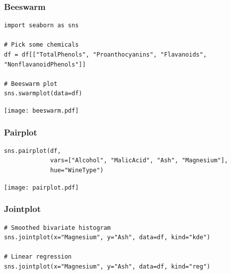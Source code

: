 \documentclass[xcolor=table]{beamer}
\begin{document}
\begin{frame}[fragile]
\frametitle{Beeswarm}

\begin{lstlisting}[style=python]
import seaborn as sns

# Pick some chemicals
df = df[["TotalPhenols", "Proanthocyanins", "Flavanoids", "NonflavanoidPhenols"]]

# Beeswarm plot
sns.swarmplot(data=df)
\end{lstlisting}

\vspace{-0.7cm}
\begin{center}
	\texttt{[image: beeswarm.pdf]}
\end{center}

\end{frame}

\begin{frame}[fragile]
\frametitle{Pairplot}

\begin{lstlisting}[style=python]
sns.pairplot(df, 
             vars=["Alcohol", "MalicAcid", "Ash", "Magnesium"],
             hue="WineType")
\end{lstlisting}

\vspace{-0.7cm}
\begin{center}
	\texttt{[image: pairplot.pdf]}
\end{center}

\end{frame}

\begin{frame}[fragile]
\frametitle{Jointplot}


\begin{lstlisting}[style=python]
# Smoothed bivariate histogram
sns.jointplot(x="Magnesium", y="Ash", data=df, kind="kde")

# Linear regression
sns.jointplot(x="Magnesium", y="Ash", data=df, kind="reg")
\end{lstlisting}

\vspace{-0.7cm}
\begin{center}
\end{center}

\end{frame}
\end{document}
